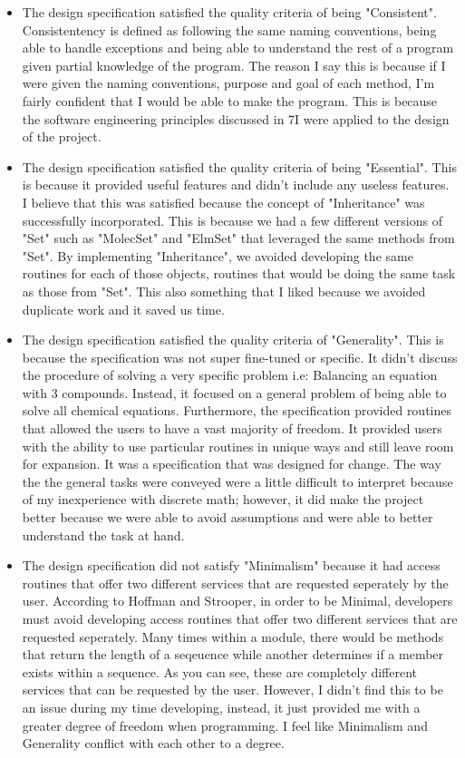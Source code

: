\documentclass[12pt]{article}
\begin{document}
\begin{itemize}
  \item The design specification satisfied the quality criteria of being "Consistent". Consistentency is defined as following the same naming conventions, being able
  to handle exceptions and being able to understand the rest of a program given partial knowledge of the program. The reason I say this is because if I were given the naming conventions,
  purpose and goal of each method, I'm fairly confident that I would be able to make the program. This is because the software engineering principles discussed in 7I were applied to the
  design of the project.

  \item The design specification satisfied the quality criteria of being "Essential". This is because it provided useful features and didn't
  include any useless features. I believe that this was satisfied because the concept of "Inheritance" was successfully incorporated. This
  is because we had a few different versions of "Set" such as "MolecSet" and "ElmSet" that leveraged the same methods from "Set". By implementing
  "Inheritance", we avoided developing the same routines for each of those objects, routines that would be doing the same task as those from "Set".
  This also something that I liked because we avoided duplicate work and it saved us time.
  
  \item The design specification satisfied the quality criteria of "Generality". This is because the specification was not super fine-tuned or specific.
  It didn't discuss the procedure of solving a very specific problem i.e: Balancing an equation with 3 compounds. Instead, it focused on a general problem 
  of being able to solve all chemical equations. Furthermore, the specification provided routines that allowed the users to have a vast majority of freedom.
  It provided users with the ability to use particular routines in unique ways and still leave room for expansion. It was a specification that was designed for change.
  The way the the general tasks were conveyed were a little difficult to interpret because of my inexperience with discrete math; however, it did make the project better 
  because we were able to avoid assumptions and were able to better understand the task at hand.

  \item The design specification did not satisfy "Minimalism" because it had access routines that offer two different services that are requested seperately by the user. According to Hoffman and Strooper,
  in order to be Minimal, developers must avoid developing access routines that offer two different services that are requested seperately. Many times within a module, there would be methods
  that return the length of a seqeuence while another determines if a member exists within a sequence. As you can see, these are completely different services that can be requested by the user. 
  However, I didn't find this to be an issue during my time developing, instead, it just provided me with a greater degree of freedom when programming. I feel like Minimalism and Generality conflict with each other
  to a degree.


\end{itemize}
\end{document}
